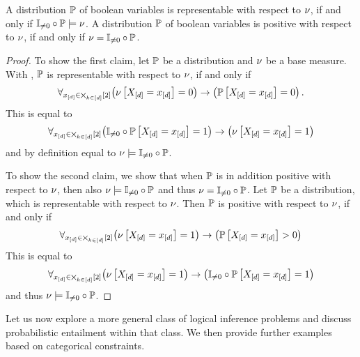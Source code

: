 \begin{theorem}\label{the:minimalRepPosBaseMeasure}
	A distribution $\mathbb{P}$ of boolean variables is representable with respect to $\nu$, if and only if $\mathbb{I}_{\neq0}\circ\mathbb{P}\models\nu$.
	A distribution $\mathbb{P}$ of boolean variables is positive with respect to $\nu$, if and only if $\nu=\mathbb{I}_{\neq0}\circ\mathbb{P}$.
\end{theorem}
\begin{proof}
	To show the first claim, let $\mathbb{P}$ be a distribution and $\nu$ be a base measure.
	With , $\mathbb{P}$ is representable with respect to $\nu$, if and only if
		\[ \forall_{x_{[d]}\in\bigtimes_{k\in[d]}[2]} \big(\nu\left[X_{[d]}=x_{[d]}\right]=0\big) \rightarrow \big(\mathbb{P}\left[X_{[d]}=x_{[d]}\right]=0\big) \, .  \]
	This is equal to
		\[ \forall_{x_{[d]}\in\bigtimes_{k\in[d]}[2]} \big(\mathbb{I}_{\neq0}\circ\mathbb{P}\left[X_{[d]}=x_{[d]}\right]=1\big) \rightarrow \big(\nu\left[X_{[d]}=x_{[d]}\right]=1\big)    \]
	and by definition  equal to $\nu\models\mathbb{I}_{\neq0}\circ\mathbb{P}$.
	
	To show the second claim, we show that when $\mathbb{P}$ is in addition positive with respect to $\nu$, then also $\nu\models\mathbb{I}_{\neq0}\circ\mathbb{P}$ and thus $\nu=\mathbb{I}_{\neq0}\circ\mathbb{P}$.
	Let $\mathbb{P}$ be a distribution, which is representable with respect to $\nu$.
	Then $\mathbb{P}$ is positive with respect to $\nu$, if and only if
		\[ \forall_{x_{[d]}\in\bigtimes_{k\in[d]}[2]} \big(\nu\left[X_{[d]}=x_{[d]}\right]=1\big) \rightarrow \big(\mathbb{P}\left[X_{[d]}=x_{[d]}\right]>0\big)   \]
	This is equal to
		\[ \forall_{x_{[d]}\in\bigtimes_{k\in[d]}[2]} \big(\nu\left[X_{[d]}=x_{[d]}\right]=1\big) \rightarrow \big(\mathbb{I}_{\neq0}\circ\mathbb{P}\left[X_{[d]}=x_{[d]}\right]=1\big)   \]
	and thus $\nu\models\mathbb{I}_{\neq0}\circ\mathbb{P}$.
\end{proof}



Let us now explore a more general class of logical inference problems and discuss probabilistic entailment within that class.
We then provide further examples based on categorical constraints.

